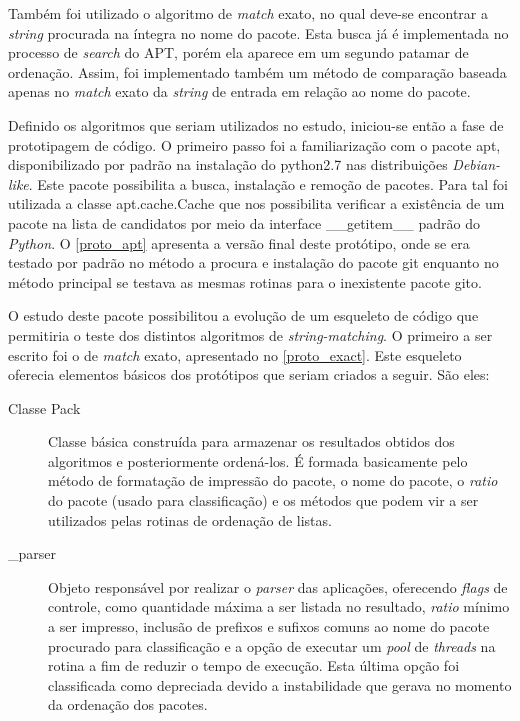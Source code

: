 Também foi utilizado o algoritmo de \textit{match} exato, no qual deve-se encontrar a \textit{string} procurada na íntegra no nome do pacote. Esta busca já é implementada no processo de \textit{search} do APT, porém ela aparece em um segundo patamar de ordenação. Assim, foi implementado também um método de comparação baseada apenas no \textit{match} exato  da \textit{string} de entrada em relação ao nome do pacote.

Definido os algoritmos que seriam utilizados no estudo, iniciou-se então a fase de prototipagem de código. O primeiro passo foi a familiarização com o pacote {\code apt}, disponibilizado por padrão na instalação do {\code python2.7} nas distribuições \textit{Debian-like}. Este pacote possibilita a busca, instalação e remoção de pacotes. Para tal foi utilizada a classe {\code apt.cache.Cache} que nos possibilita verificar a existência de um pacote na lista de candidatos por meio da interface {\code \_\_getitem\_\_} padrão do \textit{Python}. O \autoref{proto_apt} apresenta a versão final deste protótipo, onde se era testado por padrão no método a procura e instalação do pacote {\code git} enquanto no método principal se testava as mesmas rotinas para o inexistente pacote {\code gito}.

O estudo deste pacote possibilitou a evolução de um esqueleto de código que permitiria o teste dos distintos algoritmos de \textit{string-matching}. O primeiro a ser escrito foi o de \textit{match} exato, apresentado no \autoref{proto_exact}. Este esqueleto oferecia elementos básicos dos protótipos que seriam criados a seguir. São eles:

\begin{description}
	\item[Classe Pack] Classe básica construída para armazenar os resultados obtidos dos algoritmos e posteriormente ordená-los. É formada basicamente pelo método de formatação de impressão do pacote, o nome do pacote, o \textit{ratio} do pacote (usado para classificação) e os métodos que podem vir a ser utilizados pelas rotinas de ordenação de listas.
	\item [\_parser] Objeto responsável por realizar o \textit{parser} das aplicações, oferecendo \textit{flags} de controle, como quantidade máxima a ser listada no resultado, \textit{ratio} mínimo a ser impresso, inclusão de prefixos e sufixos comuns ao nome do pacote procurado para classificação e a opção de executar um \textit{pool} de \textit{threads} na rotina a fim de reduzir o tempo de execução. Esta última opção foi classificada como depreciada devido a instabilidade que gerava no momento da ordenação dos pacotes.
\end{description}

